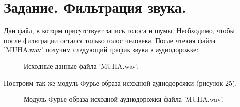 \documentclass[a5paper, 10pt]{article}
\theoremstyle{definition}
\theoremstyle{plain}
\theoremstyle{remark}
\begin{document}
\newpage
\section{Задание. Фильтрация звука.}
Дан файл, в которм присутствует запись голоса и шумы. Необходимо, чтобы после фильтрации остался только голос человека. После чтения файла 'MUHA.wav' получим следующий график звука в аудиодорожке:

\begin{figure}[h!]
\caption{Исходные данные файла 'MUHA.wav'.}
\end{figure}

Построим так же модуль Фурье-образа исходной аудиодорожки (рисунок 25).


\begin{figure}[h!]
\caption{Модуль Фурье-образа исходной аудиодорожки файла 'MUHA.wav'.}
\end{figure}
\end{document}
